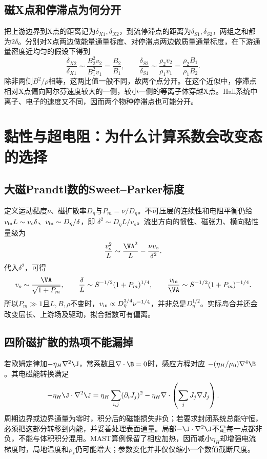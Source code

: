 \subsection{磁X点和停滞点为何分开}
把上游边界到X点的距离记为$\delta_{X1},\delta_{X2}$，到流停滞点的距离为$\delta_{S1},\delta_{S2}$，两组之和都为$2\delta$。分别对X点两边做能量通量标度、对停滞点两边做质量通量标度，在下游通量密度近均匀的假设下得到
\begin{equation}
 \frac{\delta_{X2}}{\delta_{X1}}
 \sim\frac{B_2^2v_2}{B_1^2v_1}=\frac{B_2}{B_1},\qquad
 \frac{\delta_{S2}}{\delta_{S1}}
 \sim\frac{\rho_2v_2}{\rho_1v_1}=\frac{\rho_2B_1}{\rho_1B_2}.
\end{equation}
除非两侧$B^2/\rho$相等，这两比值一般不同，故两个点分开。在这个近似中，停滞点相对X点偏向阿尔芬速度较大的一侧，较小一侧的等离子体穿越X点。Hall系统中离子、电子的速度又不同，因而两个物种停滞点也可能分开。

\section{黏性与超电阻：为什么计算系数会改变态的选择}
\subsection{大磁Prandtl数的Sweet--Parker标度}
定义运动黏度$\nu$、磁扩散率$D_\eta$与$P_m=\nu/D_\eta$。不可压层的连续性和电阻平衡仍给
$v_{\rm in}L\sim v_o\delta$、$v_{\rm in}\sim D_\eta/\delta$，即
$\delta^2\sim D_\eta L/v_o$。流出方向的惯性、磁张力、横向黏性量级为
\begin{equation}
 \frac{v_o^2}{L}\sim\frac{\VA^2}{L}-\frac{\nu v_o}{\delta^2}.
\end{equation}
代入$\delta^2$，可得
\begin{equation}
 v_o\sim\frac{\VA}{\sqrt{1+P_m}},\qquad
 \frac{\delta}{L}\sim S^{-1/2}(1+P_m)^{1/4},\qquad
 \frac{v_{\rm in}}{\VA}\sim S^{-1/2}(1+P_m)^{-1/4}.
\end{equation}
所以$P_m\gg1$且$L,B,\rho$不变时，$v_{\rm in}\propto D_\eta^{3/4}\nu^{-1/4}$，并非总是$D_\eta^{1/2}$。实际岛合并还会改变层长、上游场及驱动，拟合指数可有偏离。\citep{Stanier2013}

\subsection{四阶磁扩散的热项不能漏掉}
若欧姆定律加$-\eta_H\nabla^2\J$，常系数且$\nabla\cdot\B=0$时，感应方程对应
$-(\eta_H/\mu_0)\nabla^4\B$。其电磁能转换满足
\begin{equation}
 -\eta_H\J\cdot\nabla^2\J
 =\eta_H\sum_{i,j}(\partial_iJ_j)^2
 -\eta_H\nabla\cdot\left(\sum_jJ_j\nabla J_j\right).
\end{equation}
周期边界或边界通量为零时，积分后的磁能损失非负；若要求封闭系统总能守恒，必须把这部分转移到内能，并妥善处理表面通量。局部$-\J\cdot\nabla^2\J$不是每一点都非负，不能与体积积分混用。MAST算例保留了相应加热，因而减小$\eta_H$却增强电流梯度时，局地温度和$\rho_s$仍可能增大；参数变化并非仅仅缩小一个数值截断尺度。\citep{Stanier2013}

